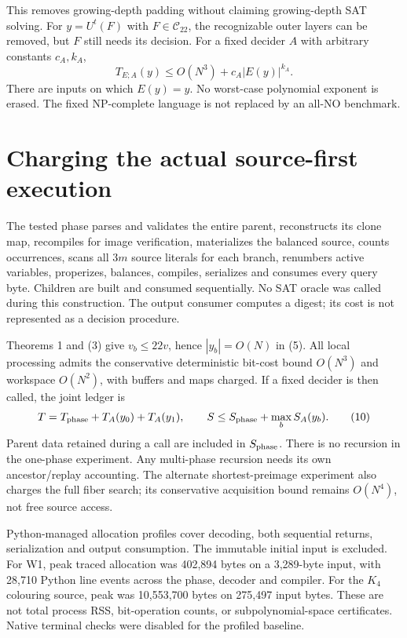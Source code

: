 \documentclass[11pt]{article}
\begin{document}
This removes growing-depth padding without claiming growing-depth SAT
solving. For $y=U^t(F)$ with $F\in\mathcal C_{22}$, the recognizable outer
layers can be removed, but $F$ still needs its decision. For a fixed decider
$A$ with arbitrary constants $c_A,k_A$,
\[
 T_{E;A}(y)\le O(N^3)+c_A|E(y)|^{k_A}.                   \tag{9}
\]
There are inputs on which $E(y)=y$. No worst-case polynomial exponent is
erased. The fixed NP-complete language is not replaced by an all-NO benchmark.

\section{Charging the actual source-first execution}
The tested phase parses and validates the entire parent, reconstructs its
clone map, recompiles for image verification, materializes the balanced source,
counts occurrences, scans all $3m$ source literals for each branch, renumbers
active variables, properizes, balances, compiles, serializes and consumes every
query byte. Children are built and consumed sequentially. No SAT oracle was
called during this construction. The output consumer computes a digest; its
cost is not represented as a decision procedure.

Theorems 1 and (3) give $v_b\le22v$, hence $|y_b|=O(N)$ in (5). All local
processing admits the conservative deterministic bit-cost bound $O(N^3)$
and workspace $O(N^2)$, with buffers and maps charged. If a fixed decider
is then called, the joint ledger is
\[
 T=T_{\rm phase}+T_A(y_0)+T_A(y_1),\qquad
 S\le S_{\rm phase}+\max_b S_A(y_b).                     \tag{10}
\]
Parent data retained during a call are included in $S_{\rm phase}$. There is
no recursion in the one-phase experiment. Any multi-phase recursion needs
its own ancestor/replay accounting. The alternate shortest-preimage experiment
also charges the full fiber search; its conservative acquisition bound remains
$O(N^4)$, not free source access.

Python-managed allocation profiles cover decoding, both sequential returns,
serialization and output consumption. The immutable initial input is excluded.
For W1, peak traced allocation was 402,894 bytes on a 3,289-byte input, with
28,710 Python line events across the phase, decoder and compiler. For the
$K_4$ colouring source, peak was 10,553,700 bytes on 275,497 input bytes.
These are not total process RSS, bit-operation counts, or subpolynomial-space
certificates. Native terminal checks were disabled for the profiled baseline.
\end{document}
